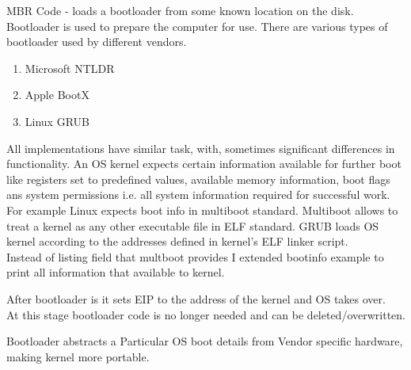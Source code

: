 \documentclass{article}
\begin{document}
        MBR Code - loads a bootloader from some known location on the disk. Bootloader is used 
        to prepare the computer for use. There are various types of bootloader used by 
        different vendors.

        \begin{enumerate}[1.]
            \item Microsoft NTLDR
            \item Apple BootX
            \item Linux GRUB
        \end{enumerate}

        All implementations have similar task, with, sometimes significant differences in functionality.
        An OS kernel expects certain information available for further boot like registers set
        to predefined values, available
        memory information, boot flags ans system permissions i.e. all system information
        required for successful work. For example 
        Linux expects boot info in multiboot standard. Multiboot allows to treat a kernel as 
        any other executable file in ELF
        standard. GRUB loads OS kernel according to the addresses defined in kernel's ELF
        linker script.
        \\
        Instead of listing field that multboot provides I extended bootinfo example to print all 
        information that available to kernel.

        After bootloader is it sets EIP to the address of the kernel and OS takes over. \\
        At this stage bootloader code is no longer needed and can be deleted/overwritten.

        Bootloader abstracts a Particular OS boot details from Vendor specific hardware,
        making kernel more portable.



    
\end{document}
